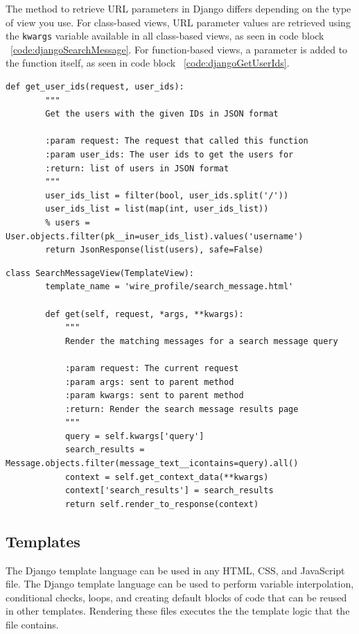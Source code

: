 The method to retrieve URL parameters in Django differs depending on the type
of view you use. For class-based views, URL parameter values are retrieved using
the \texttt{kwargs} variable available in all class-based views, as seen in
code block ~\ref{code:djangoSearchMessage}. For function-based views, a
parameter is added to the function itself, as seen in code block ~\ref{code:djangoGetUserIds}. 

\begin{lstlisting}[caption={Function-based view for returning user data},label={code:djangoGetUserIds}]
	def get_user_ids(request, user_ids):
		"""
		Get the users with the given IDs in JSON format

		:param request: The request that called this function
		:param user_ids: The user ids to get the users for
		:return: list of users in JSON format
		"""
		user_ids_list = filter(bool, user_ids.split('/'))
		user_ids_list = list(map(int, user_ids_list))
		% users = User.objects.filter(pk__in=user_ids_list).values('username')
		return JsonResponse(list(users), safe=False)
\end{lstlisting}

\clearpage

\begin{lstlisting}[caption={Class-based view to search for a given message},label={code:djangoSearchMessage}]
	class SearchMessageView(TemplateView):
		template_name = 'wire_profile/search_message.html'

		def get(self, request, *args, **kwargs):
			"""
			Render the matching messages for a search message query

			:param request: The current request
			:param args: sent to parent method
			:param kwargs: sent to parent method
			:return: Render the search message results page
			"""
			query = self.kwargs['query']
			search_results = Message.objects.filter(message_text__icontains=query).all()
			context = self.get_context_data(**kwargs)
			context['search_results'] = search_results
			return self.render_to_response(context)
\end{lstlisting}

\subsection{Templates}
The Django template language can be used in any HTML, CSS, and JavaScript
file. The Django template language can be used to perform variable interpolation,
conditional checks, loops, and creating default blocks of code that can be reused
in other templates. Rendering these files executes the the template logic that the
file contains. \parencite{djangoTemplates}

